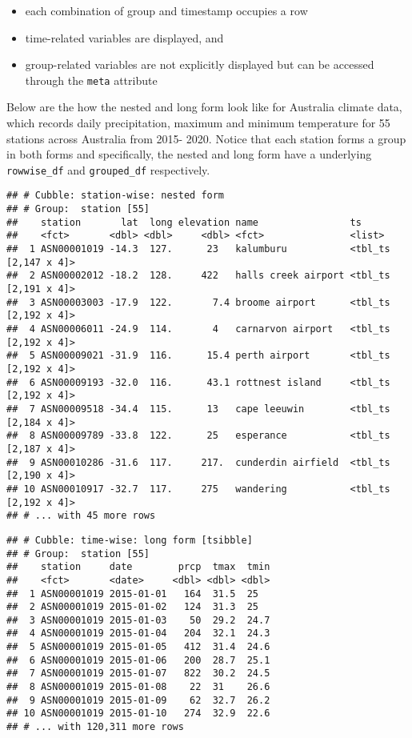 \documentclass{article}
\begin{document}
\begin{itemize}
\tightlist
\item
  each combination of group and timestamp occupies a row
\item
  time-related variables are displayed, and
\item
  group-related variables are not explicitly displayed but can be
  accessed through the \texttt{meta} attribute
\end{itemize}

Below are the how the nested and long form look like for Australia
climate data, which records daily precipitation, maximum and minimum
temperature for 55 stations across Australia from 2015- 2020. Notice
that each station forms a group in both forms and specifically, the
nested and long form have a underlying \texttt{rowwise\_df} and
\texttt{grouped\_df} respectively.

\begin{verbatim}
## # Cubble: station-wise: nested form
## # Group:  station [55]
##    station       lat  long elevation name                ts                  
##    <fct>       <dbl> <dbl>     <dbl> <fct>               <list>              
##  1 ASN00001019 -14.3  127.      23   kalumburu           <tbl_ts [2,147 x 4]>
##  2 ASN00002012 -18.2  128.     422   halls creek airport <tbl_ts [2,191 x 4]>
##  3 ASN00003003 -17.9  122.       7.4 broome airport      <tbl_ts [2,192 x 4]>
##  4 ASN00006011 -24.9  114.       4   carnarvon airport   <tbl_ts [2,192 x 4]>
##  5 ASN00009021 -31.9  116.      15.4 perth airport       <tbl_ts [2,192 x 4]>
##  6 ASN00009193 -32.0  116.      43.1 rottnest island     <tbl_ts [2,192 x 4]>
##  7 ASN00009518 -34.4  115.      13   cape leeuwin        <tbl_ts [2,184 x 4]>
##  8 ASN00009789 -33.8  122.      25   esperance           <tbl_ts [2,187 x 4]>
##  9 ASN00010286 -31.6  117.     217.  cunderdin airfield  <tbl_ts [2,190 x 4]>
## 10 ASN00010917 -32.7  117.     275   wandering           <tbl_ts [2,192 x 4]>
## # ... with 45 more rows
\end{verbatim}

\begin{verbatim}
## # Cubble: time-wise: long form [tsibble]
## # Group:  station [55]
##    station     date        prcp  tmax  tmin
##    <fct>       <date>     <dbl> <dbl> <dbl>
##  1 ASN00001019 2015-01-01   164  31.5  25  
##  2 ASN00001019 2015-01-02   124  31.3  25  
##  3 ASN00001019 2015-01-03    50  29.2  24.7
##  4 ASN00001019 2015-01-04   204  32.1  24.3
##  5 ASN00001019 2015-01-05   412  31.4  24.6
##  6 ASN00001019 2015-01-06   200  28.7  25.1
##  7 ASN00001019 2015-01-07   822  30.2  24.5
##  8 ASN00001019 2015-01-08    22  31    26.6
##  9 ASN00001019 2015-01-09    62  32.7  26.2
## 10 ASN00001019 2015-01-10   274  32.9  22.6
## # ... with 120,311 more rows
\end{verbatim}
\end{document}
